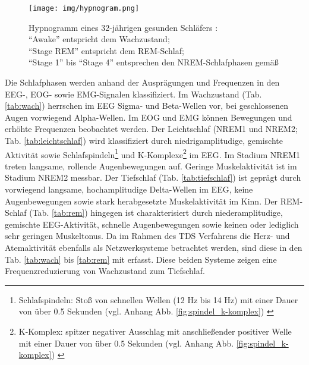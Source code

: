 \begin{figure}[H]
	\centering
	\texttt{[image: img/hypnogram.png]}
	\caption[Hypnogram von gesundem Schlaf]{Hypnogramm eines 32-jährigen gesunden Schläfers \parencite{happe_schlafmedizin_2009}:\\"`Awake"' entspricht dem Wachzustand;\\"`Stage REM"' entspricht dem \acs{REM}-Schlaf;\\"`Stage 1"' bis "`Stage 4"' entsprechen den \acs{NREM}-Schlafphasen gemäß \parencite{rechtschaffen_manual_1968}}
	\label{fig:hypnogram}
\end{figure}

Die Schlafphasen werden anhand der Ausprägungen und Frequenzen in den \acs{EEG}-, \acs{EOG}- sowie \acs{EMG}-Signalen klassifiziert. Im Wachzustand (Tab. \ref{tab:wach}) herrschen im \acs{EEG} Sigma- und Beta-Wellen vor, bei geschlossenen Augen vorwiegend Alpha-Wellen. Im \acs{EOG} und \acs{EMG} können Bewegungen und erhöhte Frequenzen beobachtet werden. Der Leichtschlaf (\acs{NREM}1 und \acs{NREM}2; Tab. \ref{tab:leichtschlaf}) wird klassifiziert durch niedrigamplitudige, gemischte Aktivität sowie Schlafspindeln\footnote{Schlafspindeln: Stoß von schnellen Wellen (12 Hz bis 14 Hz) mit einer Dauer von über 0.5 Sekunden (vgl. Anhang Abb. \ref{fig:spindel_k-komplex}) \parencite{lee-chiong_sleep_2008}} und K-Komplexe\footnote{K-Komplex: spitzer negativer Ausschlag mit anschließender positiver Welle mit einer Dauer von über 0.5 Sekunden (vgl. Anhang Abb. \ref{fig:spindel_k-komplex}) \parencite{lee-chiong_sleep_2008}} im \acs{EEG}. Im Stadium \acs{NREM}1 treten langsame, rollende Augenbewegungen auf. Geringe Muskelaktivität ist im Stadium \acs{NREM}2 messbar. Der Tiefschlaf (Tab. \ref{tab:tiefschlaf}) ist geprägt durch vorwiegend langsame, hochamplitudige Delta-Wellen im \acs{EEG}, keine Augenbewegungen sowie stark herabgesetzte Muskelaktivität im Kinn. Der \acs{REM}-Schlaf (Tab. \ref{tab:rem}) hingegen ist charakterisiert durch niederamplitudige, gemischte \acs{EEG}-Aktivität, schnelle Augenbewegungen sowie keinen oder lediglich sehr geringen Muskeltonus. Da im Rahmen des \acs{TDS} Verfahrens die Herz- und Atemaktivität ebenfalls als Netzwerksysteme betrachtet werden, sind diese in den Tab. \ref{tab:wach} bis \ref{tab:rem} mit erfasst. Diese beiden Systeme zeigen eine Frequenzreduzierung von Wachzustand zum Tiefschlaf. \parencite{lee-chiong_sleep_2008, steinberg_schlafmedizin_2010, rasche_update_2003, ebner_eeg_2006}

